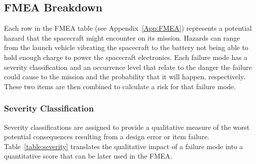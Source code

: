\documentclass[paper=letter, fontsize=11pt]{scrartcl} %
\numberwithin{equation}{section} %
\numberwithin{figure}{section} %
\numberwithin{table}{section} %
\begin{document}
\subsection{FMEA Breakdown}
Each row in the FMEA table (see Appendix~\ref{App:FMEA}) represents a potential hazard that the spacecraft might encounter on its mission. Hazards can range from the launch vehicle vibrating the spacecraft to the battery not being able to hold enough charge to power the spacecraft electronics. Each failure mode has a severity classification and an occurrence level that relate to the danger the failure could cause to the mission and the probability that it will happen, respectively. These two items are then combined to calculate a risk for that failure mode.

\subsubsection{Severity Classification}
Severity classifications are assigned to provide a qualitative measure of the worst potential consequences resulting from a design error or item failure. Table~\ref{table:severity} translates the qualitative impact of a failure mode into a quantitative score that can be later used in the FMEA.
\end{document}
